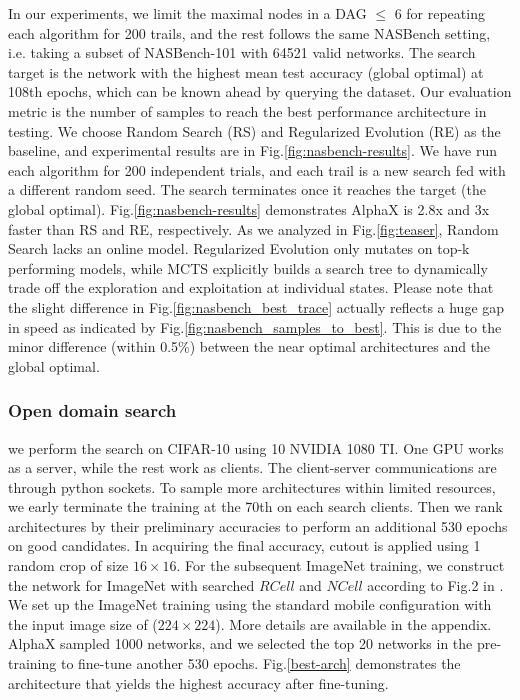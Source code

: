 \documentclass[10pt,twocolumn,letterpaper]{article}
\begin{document}
In our experiments, we limit the maximal nodes in a DAG $\leq$ 6 for repeating each algorithm for 200 trails, and the rest follows the same NASBench setting, i.e. taking a subset of NASBench-101 with 64521 valid networks. The search target is the network with the highest mean test accuracy (global optimal) at 108th epochs, which can be known ahead by querying the dataset. Our evaluation metric is the number of samples to reach the best performance architecture in testing. We choose Random Search (RS) \cite{sciuto2019evaluating} and Regularized Evolution (RE) \cite{real2018regularized} as the baseline, and experimental results are in 
Fig.\ref{fig:nasbench-results}. We have run each algorithm for 200 independent trials, and each trail is a new search fed with a different random seed. The search terminates once it reaches the target (the global optimal). Fig.\ref{fig:nasbench-results} demonstrates AlphaX is 2.8x and 3x faster than RS and RE, respectively. As we analyzed in Fig.\ref{fig:teaser}, Random Search lacks an online model. Regularized Evolution only mutates on top-k performing models, while MCTS explicitly builds a search tree to dynamically trade off the exploration and exploitation at individual states. Please note that the slight difference in Fig.\ref{fig:nasbench_best_trace} actually reflects a huge gap in speed as indicated by Fig.\ref{fig:nasbench_samples_to_best}. This is due to the minor difference (within 0.5\%) between the near optimal architectures and the global optimal.

\subsubsection{ Open domain search \cite{zoph2017learning}}
we perform the search on CIFAR-10 using 10 NVIDIA 1080 TI. One GPU works as a server, while the rest work as clients. The client-server communications are through python sockets. To sample more architectures within limited resources, we early terminate the training at the 70th on each search clients. Then we rank architectures by their preliminary accuracies to perform an additional 530 epochs on good candidates. In acquiring the final accuracy, cutout is applied \cite{cosine_restart} using 1 random crop of size $16\times16$. For the subsequent ImageNet training, we construct the network for ImageNet with searched $RCell$ and $NCell$ according to Fig.2 in \cite{zoph2017learning}. We set up the ImageNet training using the standard mobile configuration with the input image size of ($224\times224$)\cite{zoph2017learning}. More details are available in the appendix. AlphaX sampled 1000 networks, and we selected the top 20 networks in the pre-training to fine-tune another 530 epochs.  Fig.\ref{best-arch} demonstrates the architecture that yields the highest accuracy after fine-tuning.
\end{document}
